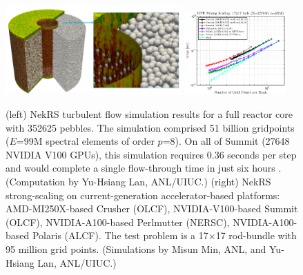 \begin{figure}[t!] \centering
    \includegraphics[width = 0.60\textwidth]{figs/pbr_pair.png}
    \includegraphics[width = 0.35\textwidth]{figs/nekrs_17x17_crusher_strong.png}
    \caption{(left) NekRS turbulent flow simulation results for a full reactor
core with 352625 pebbles.  The simulation comprised 51 billion gridpoints
($E$=99M spectral elements of order $p$=8).  On all of Summit (27648 NVIDIA
V100 GPUs), this simulation requires 0.36 seconds per step and would complete a
single flow-through time in just six hours \cite{sc22}. (Computation by
Yu-Hsiang Lan, ANL/UIUC.)
(right) NekRS strong-scaling on current-generation accelerator-based platforms:
AMD-MI250X-based Crusher (OLCF),
NVIDIA-V100-based Summit (OLCF),
NVIDIA-A100-based Perlmutter (NERSC),
NVIDIA-A100-based Polaris (ALCF).
The test problem is a 17$\times$17 rod-bundle with 95 million grid points.
(Simulations by Misun Min, ANL, and Yu-Hsiang Lan, ANL/UIUC.)
\label{fig:pbr}}
\end{figure}

